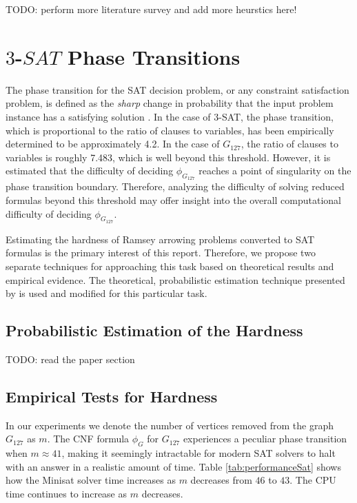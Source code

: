 \documentclass[paper=a4, fontsize=11pt]{scrartcl} %
\newcommand{\TODO}{{\color{red}TODO}}
\begin{document}
\TODO: perform more literature survey and add more heurstics here!


\section{$3$-$SAT$ Phase Transitions}
The phase transition for the SAT decision problem, or any constraint satisfaction
problem, is defined as the \emph{sharp} change in probability that
the input problem instance has a satisfying solution \cite{exploiting a theory of phase transitions in 3-satisfiability problems}.
In the case of 3-SAT, the phase transition, which is proportional to the ratio of
clauses to variables, has been empirically determined to be approximately 4.2.
In the case of $G_{127}$, the ratio of clauses to variables is roughly 7.483, 
which is well beyond this threshold. However, it is estimated that
the difficulty of deciding $\phi_{G_{127}}$ reaches a point of singularity
on the phase transition boundary. Therefore, analyzing the difficulty of solving
reduced formulas beyond this threshold may offer insight into the overall computational 
difficulty of deciding $\phi_{G_{127}}$.

Estimating the hardness of Ramsey arrowing problems converted to SAT formulas 
is the primary interest of this report. Therefore, we propose two separate
techniques for approaching this task based on theoretical results and empirical
evidence. The theoretical, probabilistic estimation technique presented by 
\cite{same as above} is used and modified for this particular task. 

\subsection{Probabilistic Estimation of the Hardness}
\TODO: read the paper section

\subsection{Empirical Tests for Hardness}
In our experiments we denote the number of vertices removed from the graph $G_{127}$ as $m$.
The CNF formula $\phi_G$ for $G_{127}$ experiences a peculiar phase transition when $m \approx 41$,
making it seemingly intractable for modern SAT solvers to halt with an answer in a realistic 
amount of time. Table \ref{tab:performanceSat} shows how the Minisat solver time increases 
as $m$ decreases from $46$ to $43$. The CPU time continues to increase as $m$ decreases.
\end{document}
